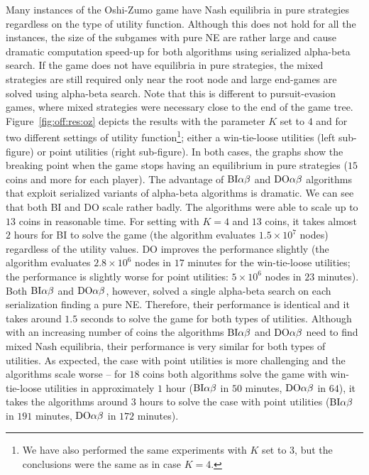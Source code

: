 Many instances of the Oshi-Zumo game have Nash equilibria in pure strategies regardless on the type of utility function.
Although this does not hold for all the instances, the size of the subgames with pure NE are rather large and cause dramatic computation speed-up for both algorithms using serialized alpha-beta search.
If the game does not have equilibria in pure strategies, the mixed strategies are still required only near the root node and large end-games are solved using alpha-beta search.
Note that this is different to pursuit-evasion games, where mixed strategies were necessary close to the end of the game tree.
Figure~\ref{fig:off:res:oz} depicts the results with the parameter $K$ set to $4$ and for two different settings of utility function\footnote{We have also performed the same experiments with $K$ set to $3$, but the conclusions were the same as in case $K=4$.}; either a win-tie-loose utilities (left sub-figure) or point utilities (right sub-figure).
In both cases, the graphs show the breaking point when the game stops having an equilibrium in pure strategies ($15$ coins and more for each player).
The advantage of $\textrm{BI}\alpha\beta$ and $\textrm{DO}\alpha\beta$ algorithms that exploit serialized variants of alpha-beta algorithms is dramatic. 
We can see that both \textsc{BI} and \textsc{DO} scale rather badly.
The algorithms were able to scale up to $13$ coins in reasonable time. 
For setting with $K=4$ and $13$ coins, it takes almost $2$ hours for \textsc{BI} to solve the game (the algorithm evaluates $1.5\times10^7$ nodes) regardless of the utility values.
\textsc{DO} improves the performance slightly (the algorithm evaluates $2.8\times10^6$ nodes in $17$ minutes for the win-tie-loose utilities; the performance is slightly worse for point utilities: $5\times10^6$ nodes in $23$ minutes).
Both $\textrm{BI}\alpha\beta$ and $\textrm{DO}\alpha\beta$, however, solved a single alpha-beta search on each serialization finding a pure NE.
Therefore, their performance is identical and it takes around $1.5$ seconds to solve the game for both types of utilities.
Although with an increasing number of coins the algorithms $\textrm{BI}\alpha\beta$ and $\textrm{DO}\alpha\beta$ need to find mixed Nash equilibria, their performance is very similar for both types of utilities.
As expected, the case with point utilities is more challenging and the algorithms scale worse -- for $18$ coins both algorithms solve the game with win-tie-loose utilities in approximately $1$ hour ($\textrm{BI}\alpha\beta$ in $50$ minutes, $\textrm{DO}\alpha\beta$ in $64$), it takes the algorithms around $3$ hours to solve the case with point utilities ($\textrm{BI}\alpha\beta$ in $191$ minutes, $\textrm{DO}\alpha\beta$ in $172$ minutes).

